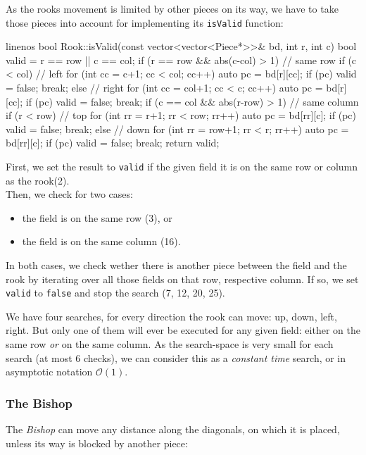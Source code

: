 As the rooks movement is limited by other pieces on its way, we have to take those pieces
into account for implementing its \texttt{isValid} function:

\begin{cpp*}{linenos}
bool Rook::isValid(const vector<vector<Piece*>>& bd, int r, int c) {
  bool valid = r == row || c == col;
  if (r == row && abs(c-col) > 1) { // same row
    if (c < col) { // left
      for (int cc = c+1; cc < col; cc++) {
        auto pc = bd[r][cc];
        if (pc) { valid = false; break; }
      }
    } else { // right
      for (int cc = col+1; cc < c; cc++) {
        auto pc = bd[r][cc];
        if (pc) { valid = false; break; }
      }
    }
  }
  if (c == col && abs(r-row) > 1) { // same column
    if (r < row) { // top
      for (int rr = r+1; rr < row; rr++) {
        auto pc = bd[rr][c];
        if (pc) { valid = false; break; }
      }
    } else { // down
      for (int rr = row+1; rr < r; rr++) {
        auto pc = bd[rr][c];
        if (pc) { valid = false; break; }
      }
    }
  }
  return valid;
}
\end{cpp*}

First, we set the result to \texttt{valid} if the given field it is on the same row
or column as the rook(2).\\
Then, we check for two cases:
\begin{itemize}
  \item the field is on the same row (3), or
  \item the field is on the same column (16).
\end{itemize}

In both cases, we check wether there is another piece between the field and the rook by
iterating over all those fields on that row, respective column.
If so, we set \texttt{valid} to \texttt{false} and stop the search (7, 12, 20, 25).

We have four searches, for every direction the rook can move: up, down, left, right.
But only one of them will ever be executed for any given field: either on the same row \emph{or}
on the same column.
As the search-space is very small for each search (at most 6 checks), we can consider this as a
\emph{constant time} search, or in asymptotic notation $\mathcal{O}(1)$.

\subsubsection{The Bishop}
The \emph{Bishop} can move any distance along the diagonals, on which it is placed,
unless its way is blocked by another piece:

